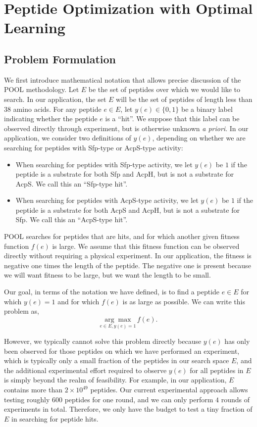 \section{Peptide Optimization with Optimal Learning}

\subsection{Problem Formulation}
We first introduce mathematical notation that allows precise discussion of the POOL methodology. Let $E$ be the set of peptides over which we would like to search.
In our application, the set $E$ will be the set of peptides of length less than 38 amino acids.
For any peptide $e \in E$, let $y(e) \in \{0, 1\}$ be a binary label indicating whether
the peptide $e$ is a ``hit''.  We suppose that this label can be observed directly through experiment, but is otherwise unknown {\it a priori}.
In our application, we consider two definitions of $y(e)$, depending on whether we are searching for peptides with Sfp-type or AcpS-type activity:
\begin{itemize}
\item When searching for peptides with Sfp-type activity, we let $y(e)$ be $1$ if the peptide is a substrate for both Sfp and AcpH, but is not a substrate for AcpS.  We call this an \enquote{Sfp-type hit}.
\item When searching for peptides with AcpS-type activity, we let $y(e)$ be $1$ if the peptide is a substrate for both AcpS and AcpH, but is not a substrate for Sfp.  We call this an \enquote{AcpS-type hit}.
\end{itemize}

POOL searches for peptides that are hits, and for which another given fitness function $f(e)$ is large.   We assume that this fitness function can be observed directly without requiring a physical experiment. In our application, the fitness is negative one times the length of the peptide.  The negative one is present because we will want fitness to be large, but we want the length to be small.

Our goal, in terms of the notation we have defined, is to find a peptide $e\in E$ for which $y(e)=1$ and for which $f(e)$ is as large as possible.  We can write this problem as,
\begin{equation}
  \underset{e \in E, y(e) = 1}{\arg\max} \, f(e).
  \label{eq:general problem}
\end{equation}

However, we typically cannot solve this problem directly because $y(e)$ has only been observed for those peptides on which we have performed an experiment, which is typically only a small fraction of the peptides in our search space $E$, and the additional experimental effort required to observe $y(e)$ for all peptides in $E$ is simply beyond the realm of feasibility.  
For example, in our application, $E$ contains more than $2 \times 10^{49}$ peptides. Our current experimental approach allows testing roughly $600$ peptides for one round, and we can only perform $4$ rounds of experiments in total. Therefore, we only have the budget to test a tiny fraction of $E$ in searching for peptide hits.

